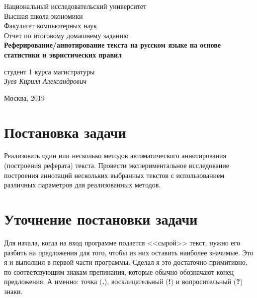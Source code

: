 \documentclass[oneside,final,12pt]{article}
\begin{document}
\begin{titlepage}
\begin{center}

    Национальный исследовательский университет\\
    Высшая школа экономики\\
    Факультет компьютерных наук\\[60mm]
    \bigskip
    Отчет по итоговому домашнему заданию \\[5mm]   
    \textsf{\large\bfseries
         Реферирование/аннотирование текста на русском языке на основе статистики и эвристических правил
    }\\[50mm]

   
    \begin{flushright}
        \parbox{0.4\textwidth}{
            студент 1 курса магистратуры\\
            \emph{Зуев Кирилл Александрович}\\[5mm]
        }
    \end{flushright}

    \vspace{\fill}
    Москва, 2019
\end{center}
\end{titlepage}

\newpage

\renewcommand{\contentsname}{Содержание}
\tableofcontents

\newpage

\section{Постановка задачи}

Реализовать один или несколько методов автоматического аннотирования (построения реферата) текста. Провести экспериментальное исследование построения аннотаций нескольких выбранных текстов с использованием различных параметров для реализованных методов.

\section{Уточнение постановки задачи}

Для начала, когда на вход программе подается <<сырой>> текст, нужно его разбить на предложения для того, чтобы из них оставить наиболее значимые. Это я и выполнил в первой части программы. Сделал я это достаточно примитивно, по соответсвующим знакам препинания, которые обычно обозначают конец предложения. А именно: точка (\textbf{.}), восклицательный (\textbf{!}) и вопросительный (\textbf{?}) знаки.\\
\end{document}
